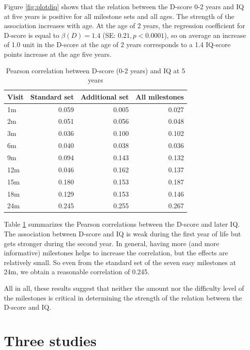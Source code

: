 \documentclass[
]{book}
\begin{document}
Figure \ref{fig:plotdiq} shows that the relation between the D-score 0-2 years and IQ at five years is positive for all milestone sets and all ages. The strength of the association increases with age. At the age of 2 years, the regression coefficient for D-score is equal to \(\beta(D) = 1.4\) (SE: \(0.21, p < 0.0001\)), so on average an increase of 1.0 unit in the D-score at the age of 2 years corresponds to a 1.4 IQ-score points increase at the age five years.

\begin{table}

\caption{\label{tab:cordiq}Pearson correlation between D-score (0-2 years) and IQ at 5 years}
\centering
\begin{tabular}[t]{lrrr}
\toprule
Visit & Standard set & Additional set & All milestones\\
\midrule
1m & 0.059 & 0.005 & 0.027\\
2m & 0.051 & 0.056 & 0.048\\
3m & 0.036 & 0.100 & 0.102\\
6m & 0.040 & 0.038 & 0.036\\
9m & 0.094 & 0.143 & 0.132\\
\addlinespace
12m & 0.046 & 0.162 & 0.137\\
15m & 0.180 & 0.153 & 0.187\\
18m & 0.129 & 0.153 & 0.146\\
24m & 0.245 & 0.255 & 0.267\\
\bottomrule
\end{tabular}
\end{table}

Table \ref{tab:cordiq} summarizes the Pearson correlations between the D-score and later IQ. The association between D-score and IQ is weak during the first year of life but gets stronger during the second year. In general, having more (and more informative) milestones helps to increase the correlation, but the effects are relatively small. So even from the standard set of the seven easy milestones at 24m, we obtain a reasonable correlation of 0.245.

All in all, these results suggest that neither the amount nor the difficulty level of the milestones is critical in determining the strength of the relation between the D-score and IQ.

\hypertarget{ch:threestudies}{%
\chapter{Three studies}\label{ch:threestudies}}
\end{document}
